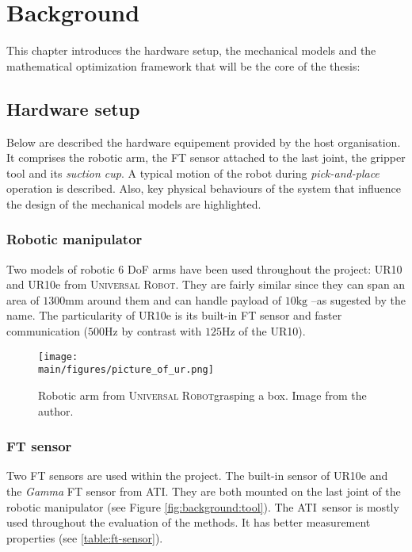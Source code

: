 \documentclass[/home/francois/latex/report/main.tex]{subfiles}
\begin{document}
\chapter{Background}
\label{chapter:background}

This chapter introduces the hardware setup, the mechanical models and the mathematical optimization framework that will be the core of the thesis:

\section{Hardware setup}
\label{section:hardware}

Below are described the hardware equipement provided by the host organisation. It comprises the robotic arm, the \ac{FT} sensor attached to the last joint, the gripper tool and its \textit{suction cup}. A typical motion of the robot during \textit{pick-and-place} operation is described. Also, key physical behaviours of the system that influence the design of the mechanical models are highlighted.

\subsection{Robotic manipulator}

Two models of robotic 6 \ac{DoF} arms have been used throughout the project: UR10 and UR10e from \textsc{Universal Robot}\texttrademark. They are fairly similar since they can span an area of $1300 \si{\milli\meter}$ around them and can handle payload of $10 \si{\kilo\gram}$ –as sugested by the name. The particularity of UR10e is its built-in \ac{FT} sensor and faster communication ($500 \si{\hertz}$ by contrast with $125 \si{\hertz}$ of the UR10).

\begin{figure}[H]
  \centering
  \texttt{[image: \\main/figures/picture\_of\_ur.png]}
  \caption{Robotic arm from \textsc{Universal Robot}\texttrademark grasping a box. Image from the author.}
  \label{fig:background:albert}
\end{figure}

\subsection{\ac{FT} sensor}

Two \ac{FT} sensors are used within the project. The built-in sensor of UR10e and the \textit{Gamma} \ac{FT} sensor from ATI\texttrademark. They are both mounted on the last joint of the robotic manipulator (see Figure \ref{fig:background:tool}). The ATI\texttrademark \ sensor is mostly used throughout the evaluation of the methods. It has better measurement properties (see \ref{table:ft-sensor}).
\end{document}
